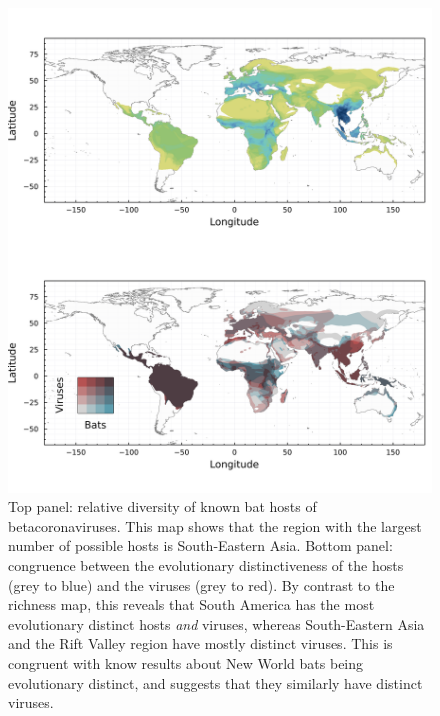 \documentclass[11pt]{article}
\makeatletter
\def\maxwidth{\ifdim\Gin@nat@width>\linewidth\linewidth
\else\Gin@nat@width\fi}
\let\Oldincludegraphics\includegraphics
\renewcommand{\includegraphics}[1]{\Oldincludegraphics[width=\maxwidth]{#1}}
\makeatother
\begin{document}
\begin{figure}
\hypertarget{fig:richness}{%
\centering
\includegraphics{figures/combined_richness.png}
\caption{Top panel: relative diversity of known bat hosts of
betacoronaviruses. This map shows that the region with the largest
number of possible hosts is South-Eastern Asia. Bottom panel: congruence
between the evolutionary distinctiveness of the hosts (grey to blue) and
the viruses (grey to red). By contrast to the richness map, this reveals
that South America has the most evolutionary distinct hosts \emph{and}
viruses, whereas South-Eastern Asia and the Rift Valley region have
mostly distinct viruses. This is congruent with know results about New
World bats being evolutionary distinct, and suggests that they similarly
have distinct viruses.}\label{fig:richness}
}
\end{figure}
\end{document}
